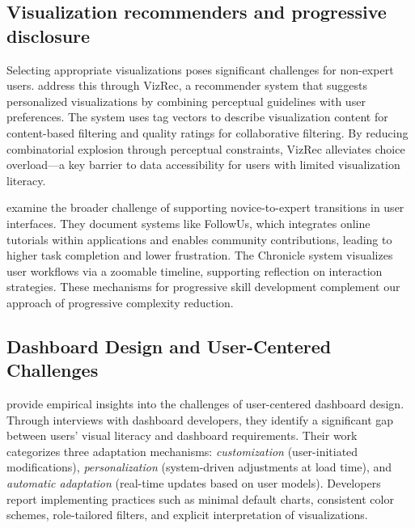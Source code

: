 \documentclass[Afour,times,sageh]{sagej}
\begin{document}
\subsection{Visualization recommenders and progressive disclosure}

Selecting appropriate visualizations poses significant challenges for non-expert users. \citet{mutlu2016vizrec} address this through VizRec, a recommender system that suggests personalized visualizations by combining perceptual guidelines with user preferences. The system uses tag vectors to describe visualization content for content-based filtering and quality ratings for collaborative filtering. By reducing combinatorial explosion through perceptual constraints, VizRec alleviates choice overload---a key barrier to data accessibility for users with limited visualization literacy.

\vspace{1em}

\noindent \citet{cockburn2014supportingnoviceto} examine the broader challenge of supporting novice-to-expert transitions in user interfaces. They document systems like FollowUs, which integrates online tutorials within applications and enables community contributions, leading to higher task completion and lower frustration. The Chronicle system visualizes user workflows via a zoomable timeline, supporting reflection on interaction strategies. These mechanisms for progressive skill development complement our approach of progressive complexity reduction.

\subsection{Dashboard Design and User-Centered Challenges}

\noindent \citet{alhamadi2022dataqualitymismatched} provide empirical insights into the challenges of user-centered dashboard design. Through interviews with dashboard developers, they identify a significant gap between users' visual literacy and dashboard requirements. Their work categorizes three adaptation mechanisms: \textit{customization} (user-initiated modifications), \textit{personalization} (system-driven adjustments at load time), and \textit{automatic adaptation} (real-time updates based on user models). Developers report implementing practices such as minimal default charts, consistent color schemes, role-tailored filters, and explicit interpretation of visualizations.

\vspace{1em}
\end{document}
